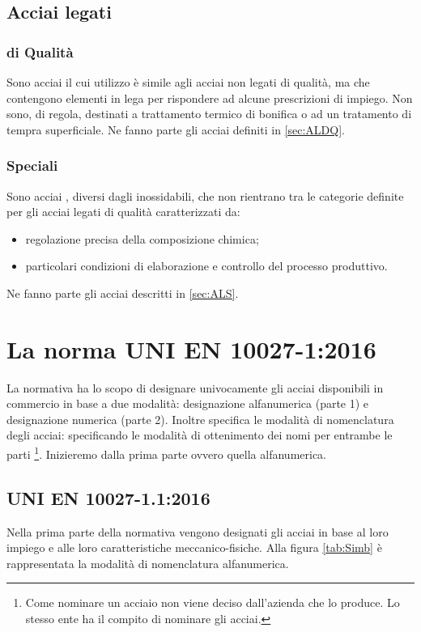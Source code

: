 \subsection{Acciai legati}
\begin{multicols}{2}[]
\subsubsection{di Qualità}
Sono acciai il cui utilizzo è simile agli acciai non legati di qualità, ma che contengono elementi in lega per rispondere ad alcune prescrizioni di impiego.
Non sono, di regola, destinati a trattamento termico di bonifica o ad un tratamento di tempra superficiale.
Ne fanno parte gli acciai definiti in \ref{sec:ALDQ}.
\columnbreak
\subsubsection{Speciali}
Sono acciai , diversi dagli inossidabili, che non rientrano tra le categorie definite per gli acciai legati di qualità caratterizzati da:
\begin{itemize}
\item regolazione precisa della composizione chimica;
\item particolari condizioni di elaborazione e controllo del processo produttivo.
\end{itemize}
Ne fanno parte gli acciai descritti in \ref{sec:ALS}.
\end{multicols}

\section{La norma UNI EN 10027-1:2016}
La normativa ha lo scopo di designare univocamente gli acciai disponibili in commercio in base a due modalità: designazione alfanumerica (parte 1) e designazione numerica (parte 2).
Inoltre specifica le modalità di nomenclatura degli acciai: specificando le modalità di ottenimento dei nomi per entrambe le parti%
\footnote{Come nominare un acciaio non viene deciso dall'azienda che lo produce. Lo stesso ente ha il compito di nominare gli acciai.}.
Inizieremo dalla prima parte ovvero quella alfanumerica.
\subsection{UNI EN 10027-1.1:2016}
Nella prima parte della normativa vengono designati gli acciai in base al loro impiego e alle loro caratteristiche meccanico-fisiche.
Alla figura \ref{tab:Simb} è rappresentata la modalità di nomenclatura alfanumerica.

